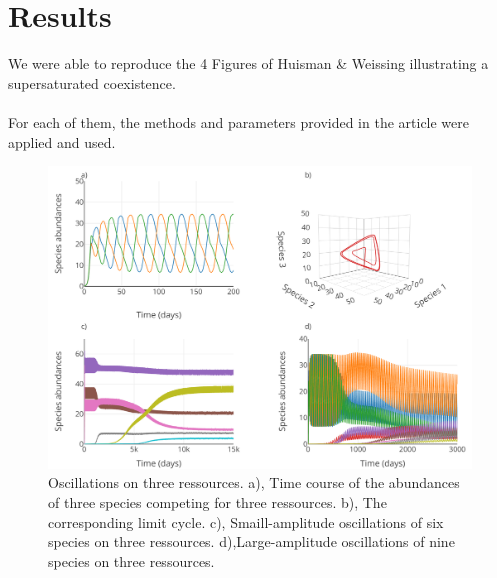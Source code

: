 \section{Results}
We were able to reproduce the 4 Figures of Huisman \& Weissing\supercite{1999:Huisman} illustrating a supersaturated coexistence. \\
\\
For each of them, the methods and parameters provided in the article were applied and used.\\ 
\begin{figure}[H]
\begin{center} 
 \includegraphics[width=1\textwidth]{../Code/Figures/Figure_1.pdf}
  \caption{Oscillations on three ressources. a), Time course of the abundances of three species competing for three ressources. b), The corresponding limit cycle. c), Smaill-amplitude oscillations of six species on three ressources. d),Large-amplitude oscillations of nine species on three ressources.}
  \label{figures:Fig1}
\end{center}
\end{figure}
